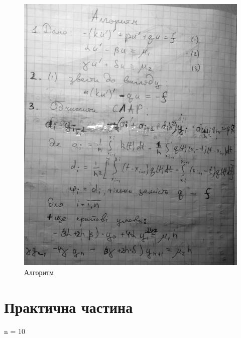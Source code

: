 \documentclass[fontsize=14pt,DIV=1,a4paper]{scrartcl}
\begin{document}
	\begin{figure}[h!]
		\includegraphics[scale=0.5]{algo.png}
		\centering
		\caption{Алгоритм}
	\end{figure}
	
	\newpage
	\section{Практична частина}
	
    \vspace{10px}
    n = 10
    \vspace{10px}
\end{document}
